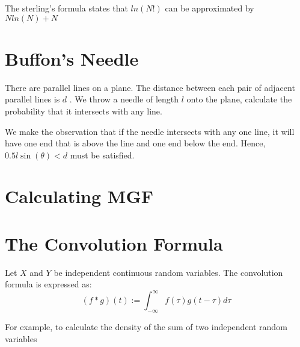 \documentclass{article}
\begin{document}
The sterling's formula states that $ln(N!)$ can be approximated by $Nln(N) + N$

\section{Buffon's Needle}

There are parallel lines on a plane. The distance between each pair of adjacent parallel lines is $d$ . We throw a needle of length $l$ onto the plane, calculate the probability that it intersects with any line. 

We make the observation that if the needle intersects with any one line, it will have one end that is above the line and one end below the end. Hence, $0.5l\sin(\theta) < d$ must be satisfied. 

\section{Calculating MGF}


\section{The Convolution Formula}

Let $X$ and $Y$ be independent continuous random variables. The convolution formula is expressed as: 
$$(f \ast g)(t):=\int_{-\infty}^{\infty} f(\tau) g(t-\tau) d \tau$$

For example, to calculate the density of the sum of two independent random variables
\end{document}
